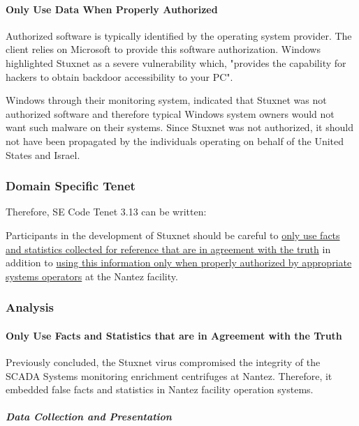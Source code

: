 \documentclass[12pt]{article}
\begin{document}
\begin{multicols}{2}
\paragraph{Only Use Data When Properly Authorized}

Authorized software is typically identified by the operating system provider. The client relies on Microsoft to provide this software authorization. Windows highlighted Stuxnet as a severe vulnerability which, "provides the capability for hackers to obtain backdoor accessibility to your PC".\cite{w32.stuxnetDossier}

Windows through their monitoring system, indicated that Stuxnet was not authorized software and therefore typical Windows system owners would not want such malware on their systems. Since Stuxnet was not authorized, it should not have been propagated by the individuals operating on behalf of the United States and Israel.

\subsubsection{Domain Specific Tenet}

Therefore, SE Code Tenet 3.13 can be written:

\begin{framed}
Participants in the development of Stuxnet should be careful to \ul{only use facts and statistics collected for reference that are in agreement with the truth} in addition to \ul{using this information only when properly authorized by appropriate systems operators} at the Nantez facility.
\end{framed}

\subsubsection{Analysis}

\paragraph{Only Use Facts and Statistics that are in Agreement with the Truth}

Previously concluded, the Stuxnet virus compromised the integrity of the SCADA Systems monitoring enrichment centrifuges at Nantez.\cite{lessonsFromStuxnet} Therefore, it embedded false facts and statistics in Nantez facility operation systems.

\subparagraph{Data Collection and Presentation}


\end{multicols}
\end{document}
